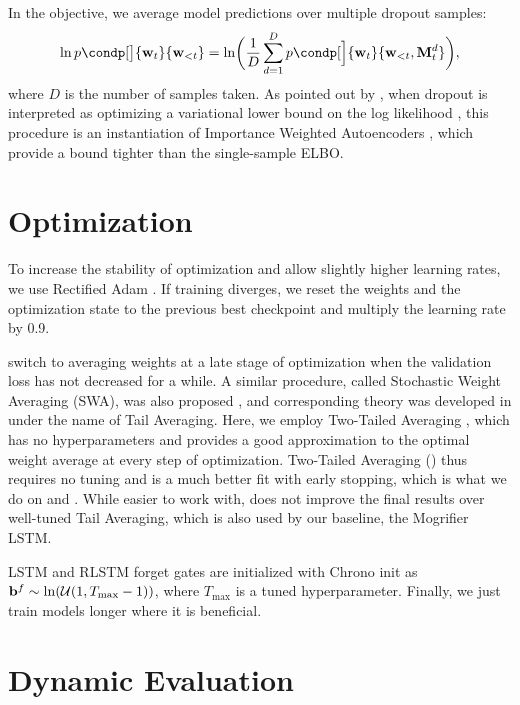 In the objective, we average model predictions over multiple dropout samples:
\begin{align*}
\ln p\condp[\big]{\vw_t}{\vw_{<t}} = \ln\biggl(\frac{1}{D} \sum_{d=1}^D p\condp[\Big]{\vw_t}{\vw_{<t},\mM^d_t}\biggr),
\end{align*}
where $D$ is the number of samples taken.
As pointed out by \citet{noh2017regularizing}, when dropout is interpreted as optimizing a variational lower bound on the log likelihood \citep{gal2016theoretically}, this procedure is an instantiation of Importance Weighted Autoencoders \citep{burda2015importance}, which provide a bound tighter than the single-sample ELBO.

\section{Optimization}

To increase the stability of optimization and allow slightly higher learning rates, we use Rectified Adam \citep{liu2019variance}.
If training diverges, we reset the weights and the optimization state to the previous best checkpoint and multiply the learning rate by 0.9.

\citet{merity2017regularizing} switch to averaging weights at a late stage of optimization when the validation loss has not decreased for a while.
A similar procedure, called Stochastic Weight Averaging (SWA), was also proposed \citep{izmailov2018averaging}, and corresponding theory was developed in \citet{jain2018parallelizing} under the name of Tail Averaging.
Here, we employ Two-Tailed Averaging \citep{https://doi.org/10.48550/arxiv.2209.12581}, which has no hyperparameters and provides a good approximation to the optimal weight average at every step of optimization.
Two-Tailed Averaging (\tta{}) thus requires no tuning and is a much better fit with early stopping, which is what we do on \enwik and \texteight \citep{hutter2012human}.
While easier to work with, \tta{} does not improve the final results over well-tuned Tail Averaging, which is also used by our baseline, the Mogrifier LSTM.

LSTM and RLSTM forget gates are initialized with Chrono init \citep{tallec2018can} as $\mathbf{b}^f \sim \ln(\mathcal{U}(1, T_\text{max}-1))$, where $T_\text{max}$ is a tuned hyperparameter.
Finally, we just train models longer where it is beneficial.

\section{Dynamic Evaluation}

